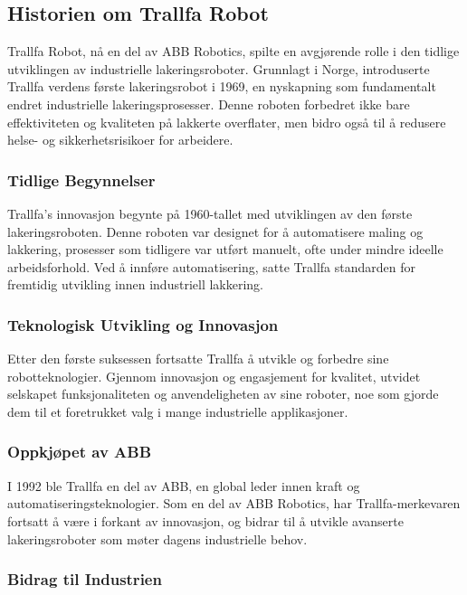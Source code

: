 \subsection{Historien om Trallfa Robot}

Trallfa Robot, nå en del av ABB Robotics, spilte en avgjørende rolle i den tidlige utviklingen av industrielle lakeringsroboter. Grunnlagt i Norge, introduserte Trallfa verdens første lakeringsrobot i 1969, en nyskapning som fundamentalt endret industrielle lakeringsprosesser. Denne roboten forbedret ikke bare effektiviteten og kvaliteten på lakkerte overflater, men bidro også til å redusere helse- og sikkerhetsrisikoer for arbeidere.

\subsubsection{Tidlige Begynnelser}

Trallfa's innovasjon begynte på 1960-tallet med utviklingen av den første lakeringsroboten. Denne roboten var designet for å automatisere maling og lakkering, prosesser som tidligere var utført manuelt, ofte under mindre ideelle arbeidsforhold. Ved å innføre automatisering, satte Trallfa standarden for fremtidig utvikling innen industriell lakkering.

\subsubsection{Teknologisk Utvikling og Innovasjon}

Etter den første suksessen fortsatte Trallfa å utvikle og forbedre sine robotteknologier. Gjennom innovasjon og engasjement for kvalitet, utvidet selskapet funksjonaliteten og anvendeligheten av sine roboter, noe som gjorde dem til et foretrukket valg i mange industrielle applikasjoner.

\subsubsection{Oppkjøpet av ABB}

I 1992 ble Trallfa en del av ABB, en global leder innen kraft og automatiseringsteknologier. Som en del av ABB Robotics, har Trallfa-merkevaren fortsatt å være i forkant av innovasjon, og bidrar til å utvikle avanserte lakeringsroboter som møter dagens industrielle behov.

\subsubsection{Bidrag til Industrien}

